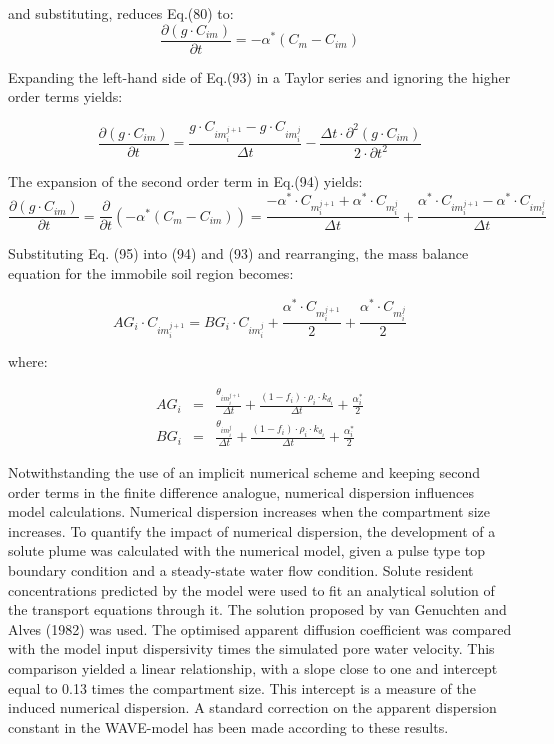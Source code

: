 and substituting, reduces Eq.(80) to:
\begin{equation}
\frac{\partial (g \cdot C_{im})}{\partial t}  = - \alpha^* (C_m  - C_{im})
\end{equation}

Expanding the left-hand side of Eq.(93) in a Taylor series and ignoring the higher order terms yields:

\begin{equation}
\frac{\partial (g \cdot C_{im})}{\partial t}  = \frac{g \cdot C_{im}_i^{j+1} - g \cdot C_{im}_i^{j}}{\Delta t} - \frac{\Delta t \cdot \partial^2(g\cdot C_{im})}{2 \cdot \partial t^2}
\end{equation}


The expansion of the second order term in Eq.(94) yields:
\begin{equation}
\frac{\partial (g \cdot C_{im})}{\partial t}  = \frac{\partial}{\partial t} (-\alpha^*(C_m-C_{im})) = \frac{-\alpha^* \cdot C_m_i^{j+1} + \alpha^* \cdot C_m_i^{j}  }{\Delta t} + \frac{\alpha^* \cdot C_{im}_i^{j+1} - \alpha^* \cdot C_{im}_i^{j}  }{\Delta t}
\end{equation}


Substituting Eq. (95) into (94) and (93) and rearranging, the mass balance equation for the immobile soil region becomes:

\begin{equation}
AG_i \cdot C_{im}_i^{j+1} = BG_i\cdot C_{im}_i^j + \frac{\alpha^* \cdot C_m_i^{j+1}}{2}  + \frac{\alpha^* \cdot C_m_i^{j}}{2}
\end{equation}

where:

\begin{eqnarray}
AG_i &=& \frac{\theta_{im}_i^{j+1}}{\Delta t} + \frac{(1-f_i)\cdot \rho_i \cdot k_d_i}{\Delta t} + \frac{\alpha_i^*}{2}\\
\nonumber
BG_i &=& \frac{\theta_{im}_i^{j}}{\Delta t} + \frac{(1-f_i)\cdot \rho_i \cdot k_d_i}{\Delta t} + \frac{\alpha_i^*}{2}
\end{eqnarray}

	

Notwithstanding the use of an implicit numerical scheme and keeping second order terms in the finite difference analogue, numerical dispersion influences model calculations. Numerical dispersion increases when the compartment size increases. To quantify the impact of numerical dispersion, the development of a solute plume was calculated with the numerical model, given a pulse type top boundary condition and a steady-state water flow condition. Solute resident concentrations predicted by the model were used to fit an analytical solution of the transport equations through it. The solution proposed by van Genuchten and Alves (1982) was used. The optimised apparent diffusion coefficient was compared with the model input dispersivity times the simulated pore water velocity. This comparison yielded a linear relationship, with a slope close to one and intercept equal to 0.13 times the compartment size. This intercept is a measure of the induced numerical dispersion. A standard correction on the apparent dispersion constant in the WAVE-model has been made according to these results.

